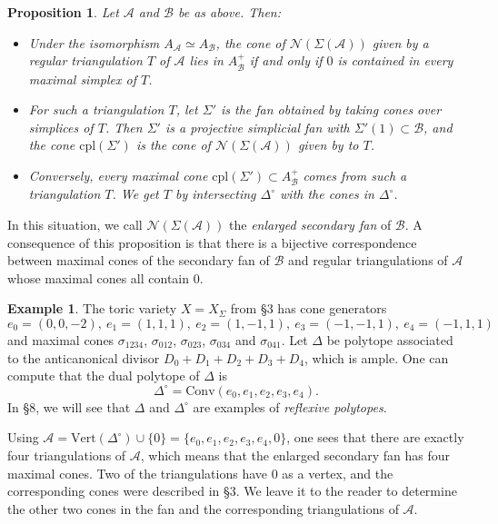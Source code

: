 \documentclass{amsart}
\theoremstyle{plain}
\newtheorem{proposition}[theorem]{Proposition}
\theoremstyle{definition}
\newtheorem*{example}{Example}
\begin{document}
\begin{proposition} Let $\mathcal{A}$ and $\mathcal{B}$ be as above.
Then: 
\begin{itemize}
\item Under the isomorphism $A_{\mathcal{A}} \simeq A_{\mathcal{B}}$, the cone
of $\mathcal{N}(\Sigma(\mathcal{A}))$ given by a regular triangulation
$T$ of $\mathcal{A}$ lies in $A^+_{\mathcal{B}}$ if and only if $0$ is
contained in every maximal simplex of $T$.
\item For such a triangulation $T$, let $\Sigma'$ is the fan obtained
by taking cones over simplices of $T$.  Then $\Sigma'$ is a projective
simplicial fan with $\Sigma'(1) \subset \mathcal{B}$, and the cone
$\mathrm{cpl}(\Sigma')$ is the cone of $\mathcal{N}(\Sigma(\mathcal{A}))$
given by to $T$.
\item Conversely, every maximal cone $\mathrm{cpl}(\Sigma') \subset
A^+_{\mathcal{B}}$ comes from such a triangulation $T$.  We get $T$ by
intersecting $\Delta^\circ$ with the cones in $\Delta^\circ$.
\end{itemize}
\end{proposition}

	In this situation, we call $\mathcal{N}(\Sigma(\mathcal{A}))$ the {\it
enlarged secondary fan\/} of $\mathcal{B}$.  A consequence of this
proposition is that there is a bijective correspondence between
maximal cones of the secondary fan of $\mathcal{B}$ and regular
triangulations of $\mathcal{A}$ whose maximal cones all contain $0$.

\begin{example} The toric variety $X = X_\Sigma$ from \S3 has cone
generators 
\[
e_0 = (0,0,-2),\ e_1 = (1,1,1),\ e_2 = (1,-1,1),\ e_3 = (-1,-1,1),\
e_4 = (-1,1,1)
\]
and maximal cones $\sigma_{1234}$, $\sigma_{012}$, $\sigma_{023}$,
$\sigma_{034}$ and $\sigma_{041}$.  Let $\Delta$ be polytope
associated to the anticanonical divisor $D_0 + D_1 + D_2 + D_3 + D_4$,
which is ample.  One can compute that the dual polytope of
$\Delta$ is
\begin{equation}
\Delta^\circ = \mathrm{Conv}(e_0,e_1,e_2,e_3,e_4).
\tag{7.4}\label{eq:7.4}
\end{equation}
In \S8, we will see that $\Delta$ and $\Delta^\circ$ are examples of {\it
reflexive polytopes\/}.

	Using $\mathcal{A} = \mathrm{Vert}(\Delta^\circ) \cup\{0\} =
\{e_0,e_1,e_2,e_3,e_4,0\}$, one sees that there are exactly
four triangulations of $\mathcal{A}$, which means that the enlarged
secondary fan has four maximal cones.  Two of the triangulations have
$0$ as a vertex, and the corresponding cones were described in \S3.
We leave it to the reader to determine the other two cones in the fan
and the corresponding triangulations of $\mathcal{A}$.
\end{example}
\end{document}
